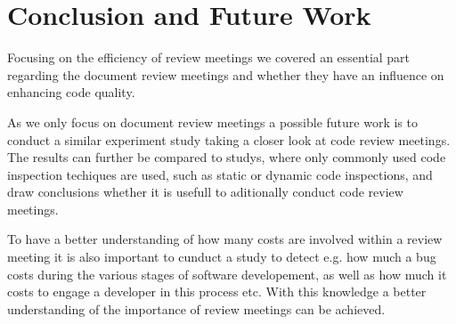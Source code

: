\section{Conclusion and Future Work}

Focusing on the efficiency of review meetings we covered an essential part regarding the document review meetings and whether they have an influence on enhancing code quality.  

As we only focus on document review meetings a possible future work is to conduct a similar experiment study taking a closer look at code review meetings. The results can further be compared to studys, where only commonly used code inspection techiques are used, such as static or dynamic code inspections, and draw conclusions whether it is usefull to aditionally conduct code review meetings.   

To have a better understanding of how many costs are involved within a review meeting it is also important to cunduct a study to detect e.g. how much a bug costs during the various stages of software developement, as well as how much it costs to engage a developer in this process etc. With this knowledge a better understanding of the importance of review meetings can be achieved.     